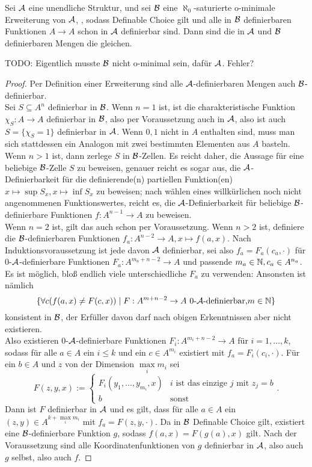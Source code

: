 \begin{lemma}\label{Erweiterung definierbare Mengen}
	Sei $\mathcal{A}$ eine unendliche Struktur, und sei $\mathcal{B}$ eine $\aleph_0$-saturierte o-minimale Erweiterung von $\mathcal{A}$, , sodass Definable Choice gilt und alle in $\mathcal{B}$ definierbaren Funktionen $A\rightarrow A$ schon in $\mathcal{A}$ definierbar sind. Dann sind die in $\mathcal{A}$ und $\mathcal{B}$ definierbaren Mengen die gleichen.
\end{lemma}
TODO: Eigentlich musste $\mathcal{B}$ nicht o-minimal sein, dafür $\mathcal{A}$. Fehler?
\begin{proof}
	Per Definition einer Erweiterung sind alle $\mathcal{A}$-definierbaren Mengen auch $\mathcal{B}$-definierbar.\\
	Sei $S\subseteq A^n$ definierbar in $\mathcal{B}$. Wenn $n=1$ ist, ist die charakteristische Funktion $\chi_S:A\rightarrow A$ definierbar in $\mathcal{B}$, also per Voraussetzung auch in $\mathcal{A}$, also ist auch $S=\{\chi_S=1\}$ definierbar in $\mathcal{A}$. Wenn $0,1$ nicht in $A$ enthalten sind, muss man sich stattdessen ein Analogon mit zwei bestimmten Elementen aus $A$ basteln.\\
	Wenn $n>1$ ist, dann zerlege $S$ in $\mathcal{B}$-Zellen. Es reicht daher, die Aussage für eine beliebige $\mathcal{B}$-Zelle $S$ zu beweisen, genauer reicht es sogar aus, die $\mathcal{A}$-Definierbarkeit für die definierende(n) partiellen Funktion(en) $x\mapsto\sup S_x,x\mapsto\inf S_x$ zu beweisen; nach wählen eines willkürlichen noch nicht angenommenen Funktionswertes, reicht es, die $\mathcal{A}$-Definierbarkeit für beliebige $\mathcal{B}$-definierbare Funktionen $f:A^{n-1}\rightarrow A$ zu beweisen.\\
	Wenn $n=2$ ist, gilt das auch schon per Voraussetzung. Wenn $n>2$ ist, definiere die $\mathcal{B}$-definierbaren Funktionen $f_a:A^{n-2}\rightarrow A,x\mapsto f(a,x)$. Nach Induktionsvoraussetzung ist jede davon $\mathcal{A}$ definierbar, sei also $f_a=F_a(c_a,\cdot)$ für 0-$\mathcal{A}$-definierbare Funktionen $F_a:A^{m_a+n-2}\rightarrow A$ und passende $m_a\in\mathbb{N},c_a\in A^{n_a}$. Es ist möglich, bloß endlich viele unterschiedliche $F_a$ zu verwenden: Ansonsten ist nämlich $$\{\forall c(f(a,x)\neq F(c,x))\mid F:A^{m+n-2}\rightarrow A\ \text{0-}\fA\text{-definierbar,}m\in\setN\}$$ konsistent in $\mathcal{B}$, der Erfüller davon darf nach obigen Erkenntnissen aber nicht existieren.\\
	Also existieren 0-$\mathcal{A}$-definierbare Funktionen $F_i:A^{m_i+n-2}\rightarrow A$ für $i=1,\dots,k$, sodass für alle $a\in A$ ein $i\leq k$ und ein $c\in A^{m_i}$ existiert mit $f_a=F_i(c_i,\cdot)$. Für ein $b\in A$ und $z$ von der Dimension $\max\limits_i m_i$ sei
	$$F(z,y,x):=\left\{\begin{array}{ll}
	F_i(y_1,\dots,y_{m_i},x)&i\text{ ist das einzige }j\text{ mit }z_j=b\\
	b&\text{sonst}
	\end{array}\right..$$
	Dann ist $F$ definierbar in $\mathcal{A}$ und es gilt, dass für alle $a\in A$ ein $(z,y)\in A^{k+\max\limits_i m_i}$ mit $f_a=F(z,y,\cdot)$. Da in $\mathcal{B}$ Definable Choice gilt, existiert eine $\mathcal{B}$-definierbare Funktion $g$, sodass $f(a,x)=F(g(a),x)$ gilt. Nach der Voraussetzung sind alle Koordinatenfunktionen von $g$ definierbar in $\mathcal{A}$, also auch $g$ selbst, also auch $f$.
\end{proof}

